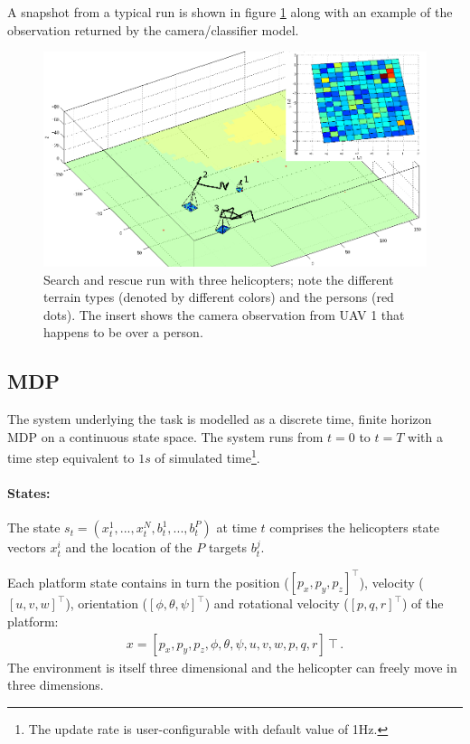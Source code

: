 \documentclass[a4paper,11pt]{report}
\begin{document}
A snapshot from a typical run is shown in figure \ref{fig:searchrescue} along with an example of the observation returned by the camera/classifier model.
\begin{figure}[ht]
\centering
\includegraphics[width=15cm]{searchrescue.jpg}
\caption{Search and rescue run with three helicopters; note the different terrain types (denoted by different colors) and the persons (red dots). The insert shows the camera observation from UAV 1 that happens to be over a person. \label{fig:searchrescue}}
\end{figure}

\subsection{MDP}
The system underlying the task is modelled as a discrete time, finite horizon MDP on a continuous state space. The system runs from $t=0$ to $t=T$ with a time step equivalent to $1s$ of simulated time\footnote{The update rate is user-configurable with default value of 1Hz.}.

\paragraph{States:} The state $s_t=(x^1_t,...,x^{N}_t,b^1_t,...,b^P_t)$ at time $t$ comprises the helicopters state vectors $x^i_t$ and the location of the $P$ targets $b^j_t$.

Each platform state contains in turn the position ($[p_x,p_y,p_z]^\intercal$), velocity ($[u,v,w]^\intercal$), orientation ($[\phi,\theta,\psi]^\intercal$) and rotational velocity ($[p,q,r]^\intercal$) of the platform:
\begin{align}
x = [p_x,p_y,p_z,\phi,\theta,\psi,u,v,w,p,q,r]\intercal .
\end{align} 
The environment is itself three dimensional and the helicopter can freely move in three dimensions.
\end{document}
